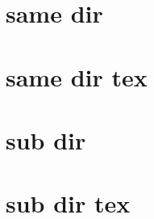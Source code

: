 \documentclass[11pt]{article}
\begin{document}
    
    \section{same dir}
    
    
    
    \section{same dir tex}
    
    
    
    \section{sub dir}
    
    
    
    \section{sub dir tex}
    
    
\end{document}
